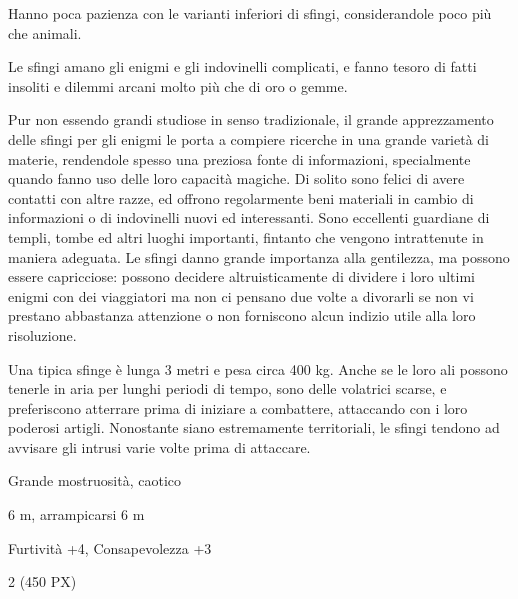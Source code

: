 \begin{multicols}{2}
{Hanno poca pazienza con le varianti inferiori di sfingi, considerandole poco più che animali.

Le sfingi amano gli enigmi e gli indovinelli complicati, e fanno tesoro di fatti insoliti e dilemmi arcani molto più che di oro o gemme.

Pur non essendo grandi studiose in senso tradizionale, il grande apprezzamento delle sfingi per gli enigmi le porta a compiere ricerche in una grande varietà di materie, rendendole spesso una preziosa fonte di informazioni, specialmente quando fanno uso delle loro capacità magiche. Di solito sono felici di avere contatti con altre razze, ed offrono regolarmente beni materiali in cambio di informazioni o di indovinelli nuovi ed interessanti. Sono eccellenti guardiane di templi, tombe ed altri luoghi importanti, fintanto che vengono intrattenute in maniera adeguata. Le sfingi danno grande importanza alla gentilezza, ma possono essere capricciose: possono decidere altruisticamente di dividere i loro ultimi enigmi con dei viaggiatori ma non ci pensano due volte a divorarli se non vi prestano abbastanza attenzione o non forniscono alcun indizio utile alla loro risoluzione.

Una tipica sfinge è lunga 3 metri e pesa circa 400 kg. Anche se le loro ali possono tenerle in aria per lunghi periodi di tempo, sono delle volatrici scarse, e preferiscono atterrare prima di iniziare a combattere, attaccando con i loro poderosi artigli. Nonostante siano estremamente territoriali, le sfingi tendono ad avvisare gli intrusi varie volte prima di attaccare.

\begin{description}[noitemsep, topsep=0pt, parsep=0pt, partopsep=0pt, itemsep=1pt, leftmargin=2.35cm,  labelwidth=2.2cm, itemindent=0cm, listparindent=0pt] %
\setlength{\baselineskip}{10pt}
\item[\textbf{Taglia/Tipo}] Grande mostruosità, caotico
\item[\textbf{Caratt.}] 
\item[\textbf{Punti Ferita}] 
\item[\textbf{Movimento}] 6 m, arrampicarsi 6 m
\item[\textbf{Tiri Salvez.}] 
\item[\textbf{Comp.}] Furtività +4, Consapevolezza +3
\item[\textbf{Sensi}] 
\item[\textbf{Sfida}] 2 (450 PX)
\end{description}
\smallskip

}
\end{multicols}
